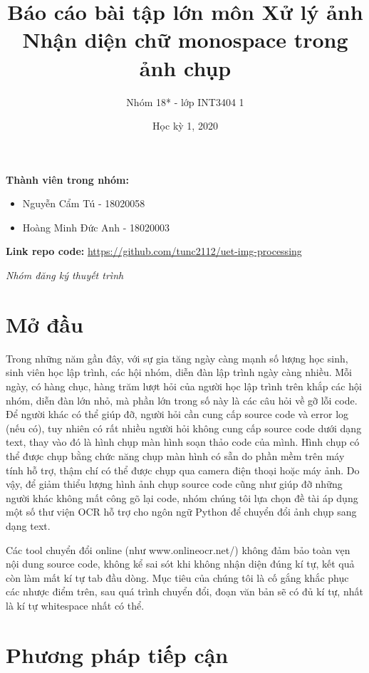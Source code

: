 \documentclass[12pt,a4paper]{article}
\title{\vspace{-1.5cm}Báo cáo bài tập lớn môn Xử lý ảnh\\Nhận diện chữ monospace trong ảnh chụp}
\author{Nhóm 18* - lớp INT3404 1}
\date{Học kỳ 1, 2020}
\begin{document}
\maketitle

\textbf{Thành viên trong nhóm:}
\begin{itemize}
	\item Nguyễn Cẩm Tú - 18020058
	\item Hoàng Minh Đức Anh - 18020003
\end{itemize}

\textbf{Link repo code:} \url{https://github.com/tunc2112/uet-img-processing}

\textit{\* Nhóm đăng ký thuyết trình}

\pagebreak

\tableofcontents

\pagebreak

\section{Mở đầu}

\indent Trong những năm gần đây, với sự gia tăng ngày càng mạnh số lượng học sinh, sinh viên học lập trình, các hội nhóm, diễn đàn lập trình ngày càng nhiều. Mỗi ngày, có hàng chục, hàng trăm lượt hỏi của người học lập trình trên khắp các hội nhóm, diễn đàn lớn nhỏ, mà phần lớn trong số này là các câu hỏi về gỡ lỗi code. Để người khác có thể giúp đỡ, người hỏi cần cung cấp source code và error log (nếu có), tuy nhiên có rất nhiều người hỏi không cung cấp source code dưới dạng text, thay vào đó là hình chụp màn hình soạn thảo code của mình. Hình chụp có thể được chụp bằng chức năng chụp màn hình có sẵn do phần mềm trên máy tính hỗ trợ, thậm chí có thể được chụp qua camera điện thoại hoặc máy ảnh. Do vậy, để giảm thiểu lượng hình ảnh chụp source code cũng như giúp đỡ những người khác không mất công gõ lại code, nhóm chúng tôi lựa chọn đề tài áp dụng một số thư viện OCR hỗ trợ cho ngôn ngữ Python để chuyển đổi ảnh chụp sang dạng text.

Các tool chuyển đổi online (như www.onlineocr.net/) không đảm bảo toàn vẹn nội dung source code, không kể sai sót khi không nhận diện đúng kí tự, kết quả còn làm mất kí tự tab đầu dòng. Mục tiêu của chúng tôi là cố gắng khắc phục các nhược điểm trên, sau quá trình chuyển đổi, đoạn văn bản sẽ có đủ kí tự, nhất là kí tự whitespace nhất có thể.

\section{Phương pháp tiếp cận}
\end{document}
